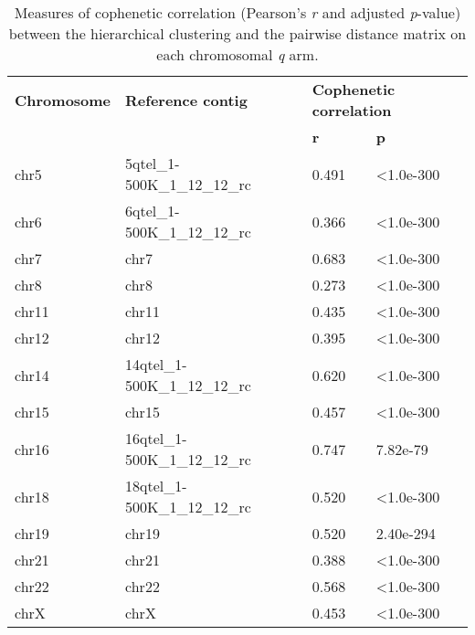 \begin{samepage} \begin{table}[h!] \small \begin{tabular}{llll}
\hline
\textbf{Chromosome} & \textbf{Reference contig}       & \multicolumn{2}{l}{\textbf{Cophenetic correlation}} \\
\textbf{}           & \textbf{}                       & \textbf{r} & \textbf{p}                             \\
\hline
chr5                & 5qtel\_1-500K\_1\_12\_12\_rc    & 0.491      & <1.0e-300                              \\
chr6                & 6qtel\_1-500K\_1\_12\_12\_rc    & 0.366      & <1.0e-300                              \\
chr7                & chr7                            & 0.683      & <1.0e-300                              \\
chr8                & chr8                            & 0.273      & <1.0e-300                              \\
chr11               & chr11                           & 0.435      & <1.0e-300                              \\
chr12               & chr12                           & 0.395      & <1.0e-300                              \\
chr14               & 14qtel\_1-500K\_1\_12\_12\_rc   & 0.620      & <1.0e-300                              \\
chr15               & chr15                           & 0.457      & <1.0e-300                              \\
chr16               & 16qtel\_1-500K\_1\_12\_12\_rc   & 0.747      & 7.82e-79                               \\
chr18               & 18qtel\_1-500K\_1\_12\_12\_rc   & 0.520      & <1.0e-300                              \\
chr19               & chr19                           & 0.520      & 2.40e-294                              \\
chr21               & chr21                           & 0.388      & <1.0e-300                              \\
chr22               & chr22                           & 0.568      & <1.0e-300                              \\
chrX                & chrX                            & 0.453      & <1.0e-300                              \\
\hline
\end{tabular}
\caption{
    \small Measures of cophenetic correlation (Pearson's \textit{r} and adjusted \textit{p}-value)
    between the hierarchical clustering and the pairwise distance matrix
    on each chromosomal \textit{q} arm.
}
\label{tab:cophenetic}
\end{table}
\end{samepage}
